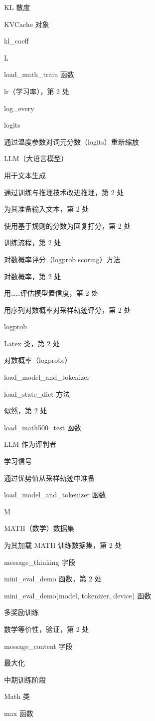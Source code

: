 KL 散度

KVCache 对象

kl\_coeff

L

load\_math\_train 函数

lr（学习率），第 2 处

log\_every

logits

通过温度参数对词元分数（logits）重新缩放

LLM（大语言模型）

用于文本生成

通过训练与推理技术改进推理，第 2 处

为其准备输入文本，第 2 处

使用基于规则的分数为回复打分，第 2 处

训练流程，第 2 处

对数概率评分（logprob scoring）方法

对数概率，第 2 处

用……评估模型置信度，第 2 处

用序列对数概率对采样轨迹评分，第 2 处

logprob

Latex 类，第 2 处

对数概率（logprobs）

load\_model\_and\_tokenizer

load\_state\_dict 方法

似然，第 2 处

load\_math500\_test 函数

LLM 作为评判者

学习信号

通过优势值从采样轨迹中准备

load\_model\_and\_tokenizer 函数

M

MATH（数学）数据集

为其加载 MATH 训练数据集，第 2 处

message\_thinking 字段

mini\_eval\_demo 函数，第 2 处

mini\_eval\_demo(model, tokenizer, device) 函数

多奖励训练

数学等价性，验证，第 2 处

message\_content 字段

最大化

中期训练阶段

Math 类

max 函数

